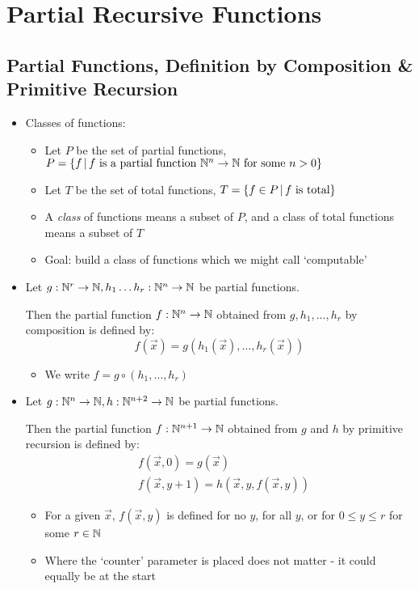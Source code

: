 \section{Partial Recursive Functions}

\subsection{Partial Functions, Definition by Composition \& Primitive Recursion}

\begin{itemize}
	
	\item Classes of functions:
	
	\begin{itemize}
		
		\item Let $ P $ be the set of partial functions, $ P = \left\lbrace f \, | \, f \text{ is a partial function } \mathbb{N}^n \to \mathbb{N} \text{ for some } n > 0 \right\rbrace $
		
		\item Let $ T $ be the set of total functions, $ T = \left\lbrace f \in P \, | \, f \text{ is total} \right\rbrace $
		
		\item A \textit{class} of functions means a subset of $ P $, and a class of total functions means a subset of $ T $
		
		\item Goal: build a class of functions which we might call `computable'
		
	\end{itemize}
	
	\item Let $ g: \mathbb{N}^r \to \mathbb{N}, h_1 \dots h_r: \mathbb{N}^n \to \mathbb{N} $ be partial functions.
	
	Then the partial function $ f: \mathbb{N}^n \to \mathbb{N} $ obtained from $ g, h_1, \dots, h_r $ by composition is defined by:
	\begin{equation*}
	f(\vec{x}) = g(h_1(\vec{x}), \dots, h_r(\vec{x}))
	\end{equation*}
	\begin{itemize}
		\item We write $f = g \circ (h_1, \dots, h_r) $
	\end{itemize}
	
	\item Let $ g: \mathbb{N}^n \to \mathbb{N}, h: \mathbb{N}^{n+2} \to \mathbb{N} $ be partial functions.
	
	Then the partial function $ f: \mathbb{N}^{n+1} \to \mathbb{N} $ obtained from $ g $ and $ h $ by primitive recursion is defined by:
	\begin{align*}
	&f(\vec{x}, 0) = g(\vec{x})\\
	&f(\vec{x}, y + 1) = h(\vec{x}, y, f(\vec{x}, y))
	\end{align*}
	\begin{itemize}
		\item For a given $ \vec{x} $, $ f(\vec{x}, y) $ is defined for no $ y $, for all $ y $, or for $ 0 \le y \le r $ for some $ r \in \mathbb{N} $
		\item Where the `counter' parameter is placed does not matter - it could equally be at the start
	\end{itemize}
	 

\end{itemize}
